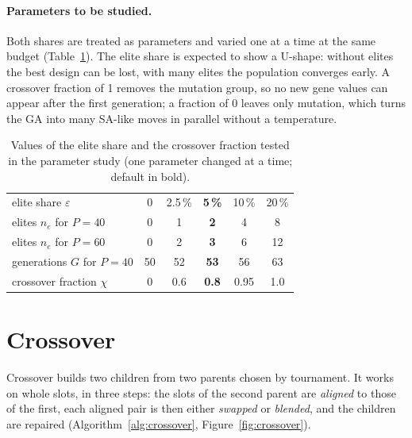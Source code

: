 \paragraph{Parameters to be studied.} Both shares are treated as parameters and varied one at a
time at the same budget (Table~\ref{tab:split-study}). The elite share is expected to show a
U-shape: without elites the best design can be lost, with many elites the population converges
early. A crossover fraction of 1 removes the mutation group, so no new gene values can appear after
the first generation; a fraction of 0 leaves only mutation, which turns the \ac{GA} into many
\ac{SA}-like moves in parallel without a temperature.

\begin{table}[htbp]
\centering
\caption{Values of the elite share and the crossover fraction tested in the parameter study
(one parameter changed at a time; default in bold).}
\label{tab:split-study}
\begin{tabular}{@{}lccccc@{}}
\toprule
elite share $\varepsilon$ & 0 & 2.5\,\% & \textbf{5\,\%} & 10\,\% & 20\,\% \\
\quad elites $n_e$ for $P=40$ & 0 & 1 & \textbf{2} & 4 & 8 \\
\quad elites $n_e$ for $P=60$ & 0 & 2 & \textbf{3} & 6 & 12 \\
\quad generations $G$ for $P=40$ & 50 & 52 & \textbf{53} & 56 & 63 \\
\midrule
crossover fraction $\chi$ & 0 & 0.6 & \textbf{0.8} & 0.95 & 1.0 \\
\bottomrule
\end{tabular}
\end{table}

\section{Crossover}
\label{sec:ga-crossover}

Crossover builds two children from two parents chosen by tournament. It works on whole slots,
in three steps: the slots of the second parent are \emph{aligned} to those of the first, each
aligned pair is then either \emph{swapped} or \emph{blended}, and the children are repaired
(Algorithm~\ref{alg:crossover}, Figure~\ref{fig:crossover}).

